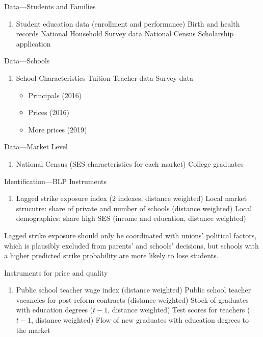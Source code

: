 \documentclass[dvipsnames]{beamer}
\begin{document}
%
\begin{frame}{Data---Students and Families}
  \begin{enumerate}
  \item Student education data (enrollment and performance)
    \vitem Birth and health records
    \vitem National Household Survey data
    \vitem National Census
    \vitem Scholarship application
  \end{enumerate}
\end{frame}
%
\begin{frame}{Data---Schools}
  \begin{enumerate}
  \item School Characteristics
    \vitem Tuition
    \vitem Teacher data
    \vitem Survey data
    \begin{itemize}
    \item Principals (2016)
    \item Prices (2016)
      \item More prices (2019)
    \end{itemize}
  \end{enumerate}
\end{frame}
%
\begin{frame}{Data---Market Level}
  \begin{enumerate}
  \item National Census (SES characteristics for each market)
    \vitem College graduates
  \end{enumerate}
\end{frame}
%
\begin{frame}{Identification---BLP Instruments}
  \begin{enumerate}
  \item Lagged strike exposure index (2 indexes, distance weighted)
    \vitem Local market strucutre: share of private and number of schools (distance weighted)
    \vitem Local demographics: share high SES (income and education, distance weighted)
  \end{enumerate}
\vfill
Lagged strike exposure should only be coordinated with unions' political factors, which is plausibly excluded from parents' and schools' decisions, but schools with a higher predicted strike probability are more likely to lose students.
\vfill
\end{frame}
%
\begin{frame}{Instruments for price and quality}
  \begin{enumerate}
  \item Public school teacher wage index (distance weighted)
    \vitem Public school teacher vacancies for post-reform contracts (distance weighted)
    \vitem Stock of graduates with education degrees ($t-1$, distance weighted)
    \vitem Test scores for teachers ($t-1$, distance weighted)
    \vitem Flow of new graduates with education degrees to the market
  \end{enumerate}
\end{frame}
\end{document}
